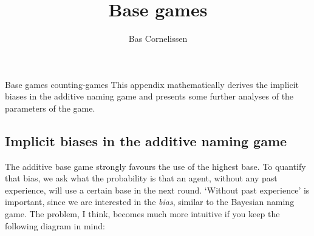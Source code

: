\documentclass{../src/bcthesispart}
\title{Base games}
\author{Bas Cornelissen}
\begin{document}

%
	{Base games}%
	{counting-games}{%
	This appendix mathematically derives the implicit biases in the additive naming game and presents some further analyses of the parameters of the game.
}




\subsection{Implicit biases in the additive naming game}

The additive base game strongly favours the use of the highest base.
To quantify that bias, we ask what the probability is that an agent, without any past experience, will use a certain base in the next round.
‘Without past experience’ is important, since we are interested in the \emph{bias}, similar to the Bayesian naming game.
The problem, I think, becomes much more intuitive if you keep the following diagram in mind:





\begin{figure}[h!]
	\centering
	
\end{figure}
\end{document}
